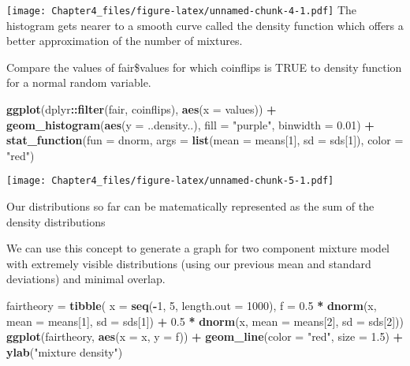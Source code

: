 \documentclass[]{article}
\newenvironment{Shaded}{\begin{snugshade}}{\end{snugshade}}
\newcommand{\DataTypeTok}[1]{\textcolor[rgb]{0.13,0.29,0.53}{#1}}
\newcommand{\DecValTok}[1]{\textcolor[rgb]{0.00,0.00,0.81}{#1}}
\newcommand{\FloatTok}[1]{\textcolor[rgb]{0.00,0.00,0.81}{#1}}
\newcommand{\KeywordTok}[1]{\textcolor[rgb]{0.13,0.29,0.53}{\textbf{#1}}}
\newcommand{\NormalTok}[1]{#1}
\newcommand{\OperatorTok}[1]{\textcolor[rgb]{0.81,0.36,0.00}{\textbf{#1}}}
\newcommand{\StringTok}[1]{\textcolor[rgb]{0.31,0.60,0.02}{#1}}
\begin{document}
\texttt{[image: Chapter4\_files/figure-latex/unnamed-chunk-4-1.pdf]} The
histogram gets nearer to a smooth curve called the density function
which offers a better approximation of the number of mixtures.

Compare the values of fair\$values for which coinflips is TRUE to
density function for a normal random variable.

\begin{Shaded}
\begin{Highlighting}[]
\KeywordTok{ggplot}\NormalTok{(dplyr}\OperatorTok{::}\KeywordTok{filter}\NormalTok{(fair, coinflips), }\KeywordTok{aes}\NormalTok{(}\DataTypeTok{x =}\NormalTok{ values)) }\OperatorTok{+}
\StringTok{   }\KeywordTok{geom_histogram}\NormalTok{(}\KeywordTok{aes}\NormalTok{(}\DataTypeTok{y =}\NormalTok{ ..density..), }\DataTypeTok{fill =} \StringTok{"purple"}\NormalTok{,}
                  \DataTypeTok{binwidth =} \FloatTok{0.01}\NormalTok{) }\OperatorTok{+}
\StringTok{   }\KeywordTok{stat_function}\NormalTok{(}\DataTypeTok{fun =}\NormalTok{ dnorm,}
          \DataTypeTok{args =} \KeywordTok{list}\NormalTok{(}\DataTypeTok{mean =}\NormalTok{ means[}\DecValTok{1}\NormalTok{], }\DataTypeTok{sd =}\NormalTok{ sds[}\DecValTok{1}\NormalTok{]), }\DataTypeTok{color =} \StringTok{"red"}\NormalTok{)}
\end{Highlighting}
\end{Shaded}

\texttt{[image: Chapter4\_files/figure-latex/unnamed-chunk-5-1.pdf]}

Our distributions so far can be matematically represented as the sum of
the density distributions

We can use this concept to generate a graph for two component mixture
model with extremely visible distributions (using our previous mean and
standard deviations) and minimal overlap.

\begin{Shaded}
\begin{Highlighting}[]
\NormalTok{fairtheory =}\StringTok{ }\KeywordTok{tibble}\NormalTok{(}
  \DataTypeTok{x =} \KeywordTok{seq}\NormalTok{(}\OperatorTok{-}\DecValTok{1}\NormalTok{, }\DecValTok{5}\NormalTok{, }\DataTypeTok{length.out =} \DecValTok{1000}\NormalTok{),}
  \DataTypeTok{f =} \FloatTok{0.5} \OperatorTok{*}\StringTok{ }\KeywordTok{dnorm}\NormalTok{(x, }\DataTypeTok{mean =}\NormalTok{ means[}\DecValTok{1}\NormalTok{], }\DataTypeTok{sd =}\NormalTok{ sds[}\DecValTok{1}\NormalTok{]) }\OperatorTok{+}
\StringTok{      }\FloatTok{0.5} \OperatorTok{*}\StringTok{ }\KeywordTok{dnorm}\NormalTok{(x, }\DataTypeTok{mean =}\NormalTok{ means[}\DecValTok{2}\NormalTok{], }\DataTypeTok{sd =}\NormalTok{ sds[}\DecValTok{2}\NormalTok{]))}
\KeywordTok{ggplot}\NormalTok{(fairtheory, }\KeywordTok{aes}\NormalTok{(}\DataTypeTok{x =}\NormalTok{ x, }\DataTypeTok{y =}\NormalTok{ f)) }\OperatorTok{+}
\StringTok{  }\KeywordTok{geom_line}\NormalTok{(}\DataTypeTok{color =} \StringTok{"red"}\NormalTok{, }\DataTypeTok{size =} \FloatTok{1.5}\NormalTok{) }\OperatorTok{+}\StringTok{ }\KeywordTok{ylab}\NormalTok{(}\StringTok{"mixture density"}\NormalTok{)}
\end{Highlighting}
\end{Shaded}
\end{document}
